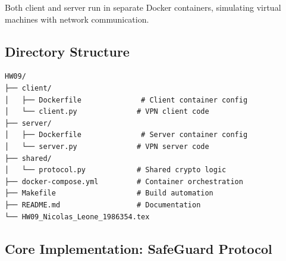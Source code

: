 \documentclass[12pt,a4paper]{article}
\begin{document}
Both client and server run in separate Docker containers, simulating virtual machines with network communication.

\subsection{Directory Structure}

\begin{verbatim}
HW09/
├── client/
│   ├── Dockerfile              # Client container config
│   └── client.py              # VPN client code
├── server/
│   ├── Dockerfile              # Server container config
│   └── server.py              # VPN server code
├── shared/
│   └── protocol.py            # Shared crypto logic
├── docker-compose.yml         # Container orchestration
├── Makefile                   # Build automation
├── README.md                  # Documentation
└── HW09_Nicolas_Leone_1986354.tex
\end{verbatim}

\subsection{Core Implementation: SafeGuard Protocol}
\end{document}

